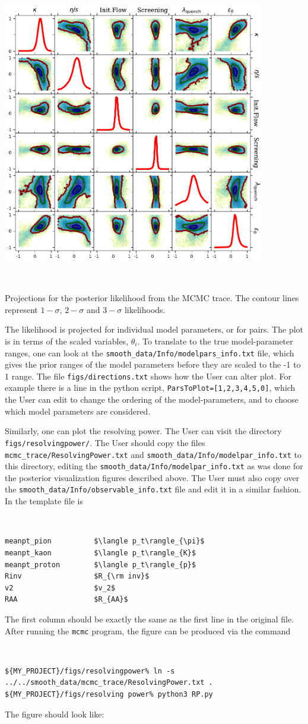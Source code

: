 \documentclass[UserManual.tex]{subfiles}
\begin{document}
\parbox{4.5in}{\centerline{\includegraphics[width=4.5in]{posterior_rhic.pdf}}}
~~\parbox{2.0in}{Projections for the posterior likelihood from the MCMC trace. The contour lines represent $1-\sigma$, $2-\sigma$ and $3-\sigma$ likelihoods.}

The likelihood is projected for individual model parameters, or for pairs. The plot is in terms of the scaled variables, $\theta_i$. To translate to the true model-parameter ranges, one can look at the {\tt smooth\_data/Info/modelpars\_info.txt} file, which gives the prior ranges of the model parameters before they are scaled to the -1 to 1 range. The file {\tt figs/directions.txt} shows how the User can alter plot. For example there is a line in the python script, {\tt ParsToPlot=[1,2,3,4,5,0]}, which the User can edit to change the ordering of the model-parameters, and to choose which model parameters are considered.

Similarly, one can plot the resolving power. The User can visit the directory {\tt figs/resolvingpower/}. The User should copy the files {\tt mcmc\_trace/ResolvingPower.txt} and {\tt smooth\_data/Info/modelpar\_info.txt} to this directory, editing the {\tt smooth\_data/Info/modelpar\_info.txt} as was done for the posterior visualization figures described above. The User must also copy over the {\tt smooth\_data/Info/observable\_info.txt} file and edit it in a similar fashion. In the template file is
{\tt
\begin{verbatim}
meanpt_pion          $\langle p_t\rangle_{\pi}$
meanpt_kaon          $\langle p_t\rangle_{K}$
meanpt_proton        $\langle p_t\rangle_{p}$
Rinv                 $R_{\rm inv}$
v2                   $v_2$
RAA                  $R_{AA}$
\end{verbatim}}
The first column should be exactly the same as the first line in the original file. After running the {\tt mcmc} program, the figure can be produced via the command
{\tt
\begin{verbatim}
${MY_PROJECT}/figs/resolvingpower% ln -s ../../smooth_data/mcmc_trace/ResolvingPower.txt .
${MY_PROJECT}/figs/resolving power% python3 RP.py
\end{verbatim}}
The figure should look like:
\end{document}
